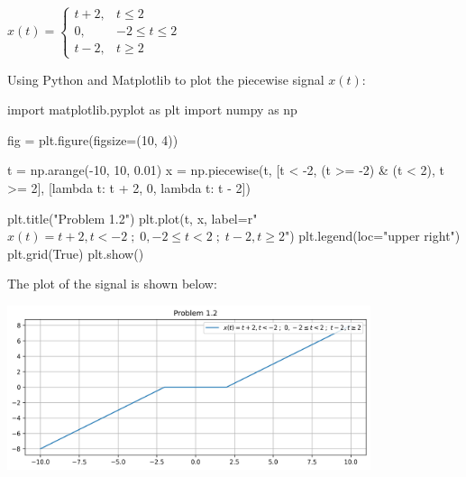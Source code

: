 \documentclass[a4paper, 10pt]{article}
\begin{document}

\newpage

\begin{subproblems}[start=2]
    \item \( x(t) = \begin{cases}
        t + 2, & t \leq 2 \\
        0, & -2 \leq t \leq 2 \\
        t - 2, & t \geq 2
    \end{cases} \)
\end{subproblems}

\begin{solution}
Using Python and Matplotlib to plot the piecewise signal \( x(t) \):
\begin{codingbox}
import matplotlib.pyplot as plt
import numpy as np

fig = plt.figure(figsize=(10, 4))

t = np.arange(-10, 10, 0.01)
x = np.piecewise(t, [t < -2, (t >= -2) & (t < 2), t >= 2], [lambda t: t + 2, 0, lambda t: t - 2])

plt.title("Problem 1.2")
plt.plot(t, x, label=r"$x(t) = t+2, t < -2 \;;\; 0, -2 \leq t < 2 \;;\; t-2, t \geq 2$")
plt.legend(loc="upper right")
plt.grid(True)
plt.show()
\end{codingbox}

The plot of the signal is shown below:
\begin{center}
    \includegraphics[width=0.8\textwidth]{images/problem_1_2.png}
\end{center}
\end{solution}

\newpage
\end{document}
